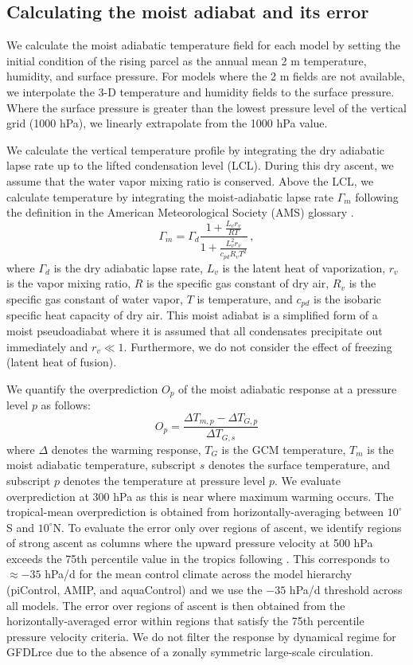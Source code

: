 \documentclass[draft]{agujournal2019}
\begin{document}
\subsection{Calculating the moist adiabat and its error}
We calculate the moist adiabatic temperature field for each model by setting the initial condition of the rising parcel as the annual mean 2 m temperature, humidity, and surface pressure. For models where the 2 m fields are not available, we interpolate the 3-D temperature and humidity fields to the surface pressure. Where the surface pressure is greater than the lowest pressure level of the vertical grid (1000 hPa), we linearly extrapolate from the 1000 hPa value.

We calculate the vertical temperature profile by integrating the dry adiabatic lapse rate up to the lifted condensation level (LCL). During this dry ascent, we assume that the water vapor mixing ratio is conserved. Above the LCL, we calculate temperature by integrating the moist-adiabatic lapse rate $\Gamma_m$ following the definition in the American Meteorological Society (AMS) glossary \cite{ams-standard}. 
\begin{equation}
\Gamma_m = \Gamma_d \frac{1 + \frac{L_v r_v}{RT}}{1 + \frac{L_v^2 r_v}{c_{pd} R_v T^2}} \, ,
\end{equation}
where $\Gamma_d$ is the dry adiabatic lapse rate, $L_v$ is the latent heat of vaporization, $r_v$ is the vapor mixing ratio, $R$ is the specific gas constant of dry air, $R_v$ is the specific gas constant of water vapor, $T$ is temperature, and $c_{pd}$ is the isobaric specific heat capacity of dry air. This moist adiabat is a simplified form of a moist pseudoadiabat where it is assumed that all condensates precipitate out immediately and $r_v \ll 1$. Furthermore, we do not consider the effect of freezing (latent heat of fusion).

We quantify the overprediction $O_p$ of the moist adiabatic response at a pressure level $p$ as follows:
\begin{equation}
    O_p = \frac{\Delta T_{m,p} - \Delta T_{G,p}}{\Delta T_{G,s}}
\end{equation}
where $\Delta$ denotes the warming response, $T_G$ is the GCM temperature, $T_m$ is the moist adiabatic temperature, subscript $s$ denotes the surface temperature, and subscript $p$ denotes the temperature at pressure level $p$. We evaluate overprediction at 300 hPa as this is near where maximum warming occurs. The tropical-mean overprediction is obtained from horizontally-averaging between $10^\circ$S and $10^\circ$N. To evaluate the error only over regions of ascent, we identify regions of strong ascent as columns where the upward pressure velocity at 500 hPa exceeds the 75th percentile value in the tropics following . This corresponds to $\approx-35$ hPa/d for the mean control climate across the model hierarchy (piControl, AMIP, and aquaControl) and we use the $-35$ hPa/d threshold across all models. The error over regions of ascent is then obtained from the horizontally-averaged error within regions that satisfy the 75th percentile pressure velocity criteria. We do not filter the response by dynamical regime for GFDLrce due to the absence of a zonally symmetric large-scale circulation.
\end{document}
